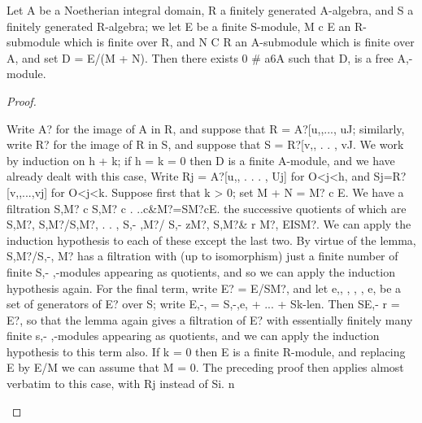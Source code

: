 \begin{theorem}[Theorem 24.2]\label{mcrt-auto-theorem-24-2}\uses{}
\begin{mathematicalrecord}
Let A be a Noetherian          integral domain, R a finitely
generated A-algebra, and S a finitely generated R-algebra; we let E be a
finite S-module, M c E an R-submodule which is finite over R, and N C R
an A-submodule which is finite over A, and set D = E/(M + N). Then there
exists 0 # a6A such that D, is a free A,-module.
\end{mathematicalrecord}
\end{theorem}
\begin{proof}
\begin{mathematicalrecord}
Write A? for the image of A in R, and suppose that R =
A?[u,,...,   uJ; similarly, write R? for the image of R in S, and suppose
that S = R?[v,, . . , vJ. We work by induction on h + k; if h = k = 0 then
D is a finite A-module, and we have already dealt with this case,
   Write Rj = A?[u,, . . . , Uj] for O<j<h,      and Sj=R?[v,,...,vj]   for
O<j<k.
   Suppose first that k > 0; set M + N = M? c E. We have a filtration
           S,M? c S,M? c . ..c&M?=SM?cE.
the successive quotients of which are S,M?, S,M?/S,M?,          . . , S,- ,M?/
S,- zM?, S,M?&       r M?, EISM?. We can apply the induction hypothesis
to each of these except the last two. By virtue of the lemma, S,M?/S,-, M?
has a filtration with (up to isomorphism)     just a finite number of finite
S,- ,-modules appearing as quotients, and so we can apply the induction
hypothesis again. For the final term, write E? = E/SM?, and let e,, , , , e,
be a set of generators of E? over S; write E,-, = S,-,e, + ... + Sk-len.
Then SE,- r = E?, so that the lemma again gives a filtration of E? with
essentially finitely many finite s,- ,-modules appearing as quotients, and
we can apply the induction hypothesis to this term also.
   If k = 0 then E is a finite R-module, and replacing E by E/M we can
assume that M = 0. The preceding proof then applies almost verbatim to
this case, with Rj instead of Si. n
\end{mathematicalrecord}
\end{proof}


